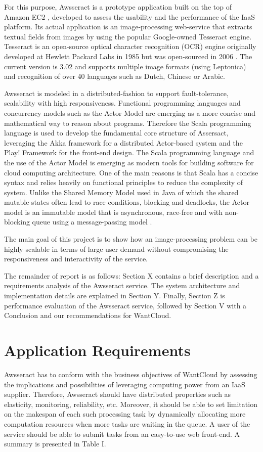 \documentclass[conference]{IEEEtran}
\begin{document}
For this purpose, Awsseract is a prototype application built on the top of Amazon EC2 \cite{amazon}, developed to assess the usability and the performance of the IaaS platform. Its actual application is an image-processing web-service that extracts textual fields from images by using the popular Google-owned Tesseract engine. Tesseract is an open-source optical character recognition (OCR) engine originally developed at Hewlett Packard Labs in 1985 but was open-sourced in 2006 \cite{tess}.  The current version is 3.02 and supports multiple image formats (using Leptonica) and recognition of over 40 languages such as Dutch, Chinese or Arabic.

Awsseract is modeled in a distributed-fashion to support fault-tolerance, scalability with high responsiveness. Functional programming languages and concurrency models such as the Actor Model are emerging as a more concise and mathematical way to reason about programs. Therefore the Scala programming language is used to develop the fundamental core structure of Assersact, leveraging the Akka framework for a distributed Actor-based system and the Play! Framework for the front-end design.  The Scala programming language and the use of the Actor Model is emerging as modern tools for building software for cloud computing architecture. One of the main reasons is that Scala has a concise syntax and relies heavily on functional principles to reduce the complexity of system. Unlike the Shared Memory Model used in Java of which the shared mutable states often lead to race conditions, blocking and deadlocks, the Actor model is an immutable model that is asynchronous, race-free and with non-blocking queue using a message-passing model \cite{akka}.
        
The main goal of this project is to show how an image-processing problem can be highly scalable in terms of large user demand without compromising the responsiveness and interactivity of the service. 

The remainder of report is as follows: Section X contains a brief description and a requirements analysis of the Awsseract service. The system architecture and implementation details are explained in Section Y. Finally, Section Z is performance evaluation of the Awsseract service, followed by Section V with a Conclusion and our recommendations for WantCloud. 

\section{Application Requirements}\label{sec:bg}
\noindent
Awsseract has to conform with the business objectives of WantCloud by assessing the implications and possibilities of leveraging computing power from an IaaS supplier. Therefore, Awsseract should have distributed properties such as elasticity, monitoring, reliability, etc. Moreover, it should be able to set limitation on the makespan of each such processing task by dynamically allocating more computation resources when more tasks are waiting in the queue. A user of the service should be able to submit tasks from an easy-to-use web front-end. A summary is presented in Table I.
\end{document}
